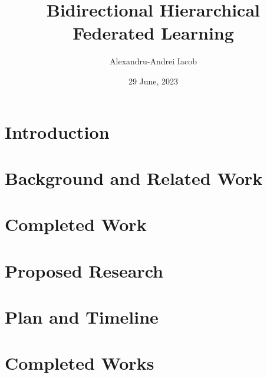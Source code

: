 \documentclass[times, withindex, backrefs, firstyr]{cam-thesis}
\title{Bidirectional Hierarchical Federated Learning}
\author{Alexandru-Andrei Iacob}
\date{29 June, 2023}
\begin{document}
\frontmatter{}
\chapter{Introduction}

\chapter{Background and Related Work}\label{sec:back}

\chapter{Completed Work}\label{sec:completed_work}

\chapter{Proposed Research}\label{sec:proposal}

\chapter{Plan and Timeline}\label{sec:timeplan}



\renewcommand{\bibname}{References}
\cleardoublepage
{}
{}






\appendix

\chapter{Completed Works}







\printthesisindex
\end{document}
